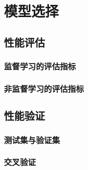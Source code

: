\chapter{模型选择} %
\label{cha:模型选择}
\section{性能评估} %
\label{sec:性能评估}
\subsection{监督学习的评估指标} %
\label{sub:监督学习的评估指标}

\subsection{非监督学习的评估指标} %
\label{sub:非监督学习的评估指标}


\section{性能验证} %
\label{sec:性能验证}
\subsection{测试集与验证集} %
\label{sub:测试集与验证集}


\subsection{交叉验证} %
\label{sub:交叉验证}


